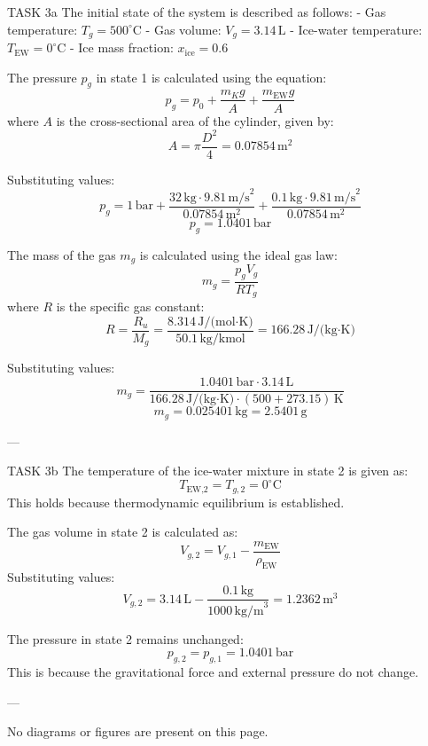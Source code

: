 TASK 3a  
The initial state of the system is described as follows:  
- Gas temperature: \( T_g = 500^\circ\text{C} \)  
- Gas volume: \( V_g = 3.14 \, \text{L} \)  
- Ice-water temperature: \( T_{\text{EW}} = 0^\circ\text{C} \)  
- Ice mass fraction: \( x_{\text{ice}} = 0.6 \)  

The pressure \( p_g \) in state 1 is calculated using the equation:  
\[
p_g = p_0 + \frac{m_K g}{A} + \frac{m_{\text{EW}} g}{A}
\]  
where \( A \) is the cross-sectional area of the cylinder, given by:  
\[
A = \pi \frac{D^2}{4} = 0.07854 \, \text{m}^2
\]  

Substituting values:  
\[
p_g = 1 \, \text{bar} + \frac{32 \, \text{kg} \cdot 9.81 \, \text{m/s}^2}{0.07854 \, \text{m}^2} + \frac{0.1 \, \text{kg} \cdot 9.81 \, \text{m/s}^2}{0.07854 \, \text{m}^2}
\]  
\[
p_g = 1.0401 \, \text{bar}
\]  

The mass of the gas \( m_g \) is calculated using the ideal gas law:  
\[
m_g = \frac{p_g V_g}{R T_g}
\]  
where \( R \) is the specific gas constant:  
\[
R = \frac{R_u}{M_g} = \frac{8.314 \, \text{J/(mol·K)}}{50.1 \, \text{kg/kmol}} = 166.28 \, \text{J/(kg·K)}
\]  

Substituting values:  
\[
m_g = \frac{1.0401 \, \text{bar} \cdot 3.14 \, \text{L}}{166.28 \, \text{J/(kg·K)} \cdot (500 + 273.15) \, \text{K}}
\]  
\[
m_g = 0.025401 \, \text{kg} = 2.5401 \, \text{g}
\]  

---

TASK 3b  
The temperature of the ice-water mixture in state 2 is given as:  
\[
T_{\text{EW,2}} = T_{g,2} = 0^\circ\text{C}
\]  
This holds because thermodynamic equilibrium is established.  

The gas volume in state 2 is calculated as:  
\[
V_{g,2} = V_{g,1} - \frac{m_{\text{EW}}}{\rho_{\text{EW}}}
\]  
Substituting values:  
\[
V_{g,2} = 3.14 \, \text{L} - \frac{0.1 \, \text{kg}}{1000 \, \text{kg/m}^3} = 1.2362 \, \text{m}^3
\]  

The pressure in state 2 remains unchanged:  
\[
p_{g,2} = p_{g,1} = 1.0401 \, \text{bar}
\]  
This is because the gravitational force and external pressure do not change.  

---

No diagrams or figures are present on this page.
